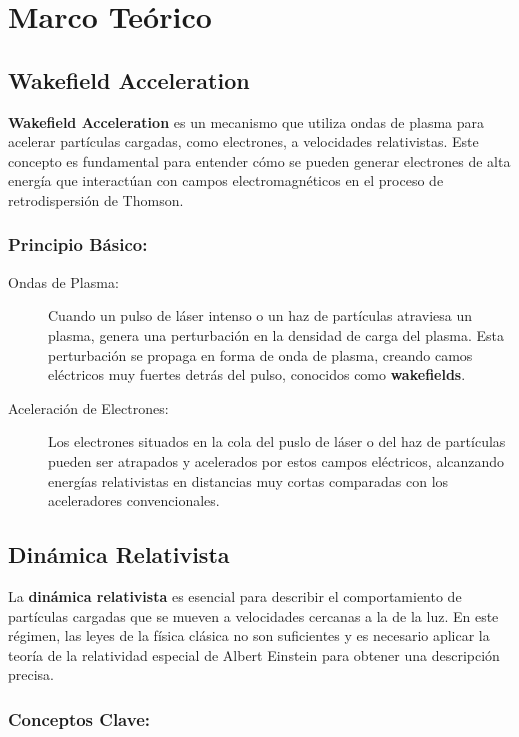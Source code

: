 



\section{Marco Teórico}


\subsection{Wakefield Acceleration}

\textbf{Wakefield Acceleration} es un mecanismo que utiliza ondas de plasma para acelerar partículas cargadas, como electrones, a velocidades relativistas. Este concepto es fundamental para entender cómo se pueden generar electrones de alta energía que interactúan con campos electromagnéticos en el proceso de retrodispersión de Thomson.

\subsubsection*{Principio Básico:}
\begin{description}
    \item[Ondas de Plasma: ] Cuando un pulso de láser intenso o un haz de partículas atraviesa un plasma, genera una perturbación en la densidad de carga del plasma. Esta perturbación se propaga en forma de onda de plasma, creando camos eléctricos muy fuertes detrás del pulso, conocidos como \textbf{wakefields}.
    \item[Aceleración de Electrones: ] Los electrones situados en la cola del puslo de láser o del haz de partículas pueden ser atrapados y acelerados por estos campos eléctricos, alcanzando energías relativistas en distancias muy cortas comparadas con los aceleradores convencionales.
\end{description}

\subsection{Dinámica Relativista}

La \textbf{dinámica relativista} es esencial para describir el comportamiento de partículas cargadas que se mueven a velocidades cercanas a la de la luz. En este régimen, las leyes de la física clásica no son suficientes y es necesario aplicar la teoría de la relatividad especial de Albert Einstein para obtener una descripción precisa.

\subsubsection*{Conceptos Clave: }

